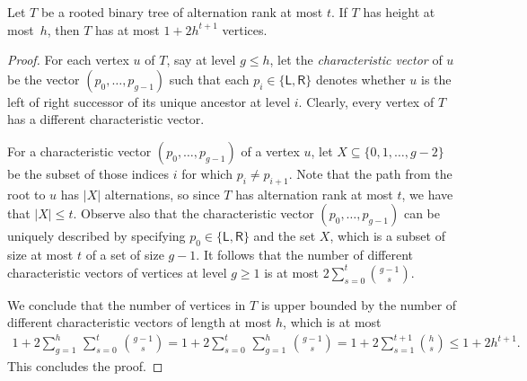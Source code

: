 \begin{lemma}\label{lem:number-of-nodes}
Let $T$ be a rooted binary tree of alternation rank at most $t$. If
$T$ has height at most~$h$, then $T$ has at most $1+2h^{t+1}$
vertices. 
\end{lemma}
\begin{proof}
For each vertex $u$ of $T$, say at level $g\leq h$, let the {\em{characteristic vector}} of $u$ be the vector $(p_0,\ldots,p_{g-1})$ such that each $p_i\in \{\mathsf{L},\mathsf{R}\}$ denotes
whether $u$ is the left of right successor of its unique ancestor at level $i$. Clearly, every vertex of $T$ has a different characteristic vector.

For a characteristic vector $(p_0,\ldots,p_{g-1})$ of a vertex $u$, let $X\subseteq \{0,1,\ldots,g-2\}$ be the subset of those indices $i$ for which $p_i\neq p_{i+1}$. 
Note that the path from the root to $u$ has $|X|$ alternations, so since $T$ has alternation rank at most $t$, we have that $|X|\leq t$.
Observe also that the characteristic vector $(p_0,\ldots,p_{g-1})$ can be uniquely described by specifying $p_0\in \{\mathsf{L},\mathsf{R}\}$ and the set $X$, which is a subset of size at most $t$ of
a set of size $g-1$.
It follows that the number of different characteristic vectors of vertices at level $g\geq 1$ is at most $2\sum_{s=0}^{t}\binom{g-1}{s}$.

We conclude that the number of vertices in $T$ is upper bounded by the number of different characteristic vectors of length at most $h$, which is at most
\begin{align*}
1+2\sum_{g=1}^h\, \sum_{s=0}^t\, \binom{g-1}{s}=1+2\sum_{s=0}^t\, \sum_{g=1}^h\, \binom{g-1}{s}= 1+2\sum_{s=1}^{t+1} \binom{h}{s}\leq 1+2h^{t+1}.
\end{align*}
This concludes the proof.
\end{proof}




